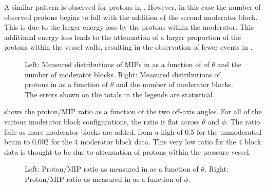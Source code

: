 A similar pattern is observed for protons in .
However, in this case the number of observed protons begins to fall with the addition of the second moderator block.
This is due to the larger energy loss by the protons within the moderator.
This additional energy loss leads to the attenuation of a larger proportion of the protons within the vessel walls, resulting in the observation of fewer events in \SFour.

\begin{figure}[h]
  \begin{minipage}[t]{.5\textwidth}
    \begin{adjustbox}{max totalsize=\textwidth, center}
      
    \end{adjustbox}
  \end{minipage}
  \hfill
  \begin{minipage}[t]{.5\textwidth}
    \begin{adjustbox}{max totalsize=\textwidth, center}
      
    \end{adjustbox}
  \end{minipage}
  \caption[\SFour particle rates as a function of $\theta$ and moderator blocks]{Left: Measured distributions of MIPs in \SFour as a function of of $\theta$ and the number of moderator blocks. Right: Measured distributions of protons in \SFour as a function of $\theta$ and the number of moderator blocks. The errors shown on the totals in the legends are statistical.}
  \label{fig:s4Rates}
\end{figure}

 shows the proton/MIP ratio as a function of the two off-axis angles.
For all of the various moderator block configurations, the ratio is flat across $\theta$ and $\phi$.
The ratio falls as more moderator blocks are added, from a high of 0.5 for the unmoderated beam to \num{0.002} for the 4 moderator block data.
This very low ratio for the 4 block data is thought to be due to attenuation of protons within the pressure vessel.

\begin{figure}[h]
  \begin{minipage}[t]{.5\textwidth}
    \begin{adjustbox}{max totalsize=\textwidth, center}
      
    \end{adjustbox}
  \end{minipage}
  \hfill
  \begin{minipage}[t]{.5\textwidth}
    \begin{adjustbox}{max totalsize=\textwidth, center}
      
    \end{adjustbox}
  \end{minipage}
  \caption[Proton/MIP ratios as measured in \SFour as a function of $\theta$ and $\phi$]{Left: Proton/MIP ratio as measured in \SFour as a function of $\theta$. Right: Proton/MIP ratio as measured in \SFour as a function of $\phi$.}
  \label{fig:s4Ratios}
\end{figure}

